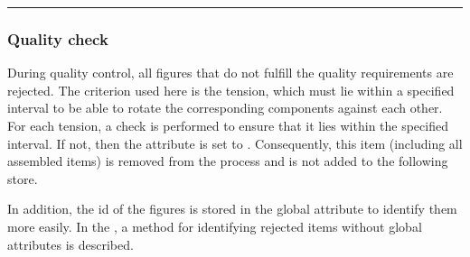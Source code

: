 \documentclass[letterpaper,10pt,english]{sphinxmanual}
\begin{document}
\bigskip\hrule\bigskip



\subsubsection{Quality check}
\label{\detokenize{source/Examples/example04:quality-check}}\label{\detokenize{source/Examples/example04:id2}}
\sphinxAtStartPar
During quality control, all figures that do not fulfill the quality requirements are rejected. The criterion used here
is the tension, which must lie within a specified interval to be able to rotate the corresponding components against
each other. For each tension, a check is performed to ensure that it lies within the specified interval. If not, then
the  attribute is set to . Consequently, this item (including all assembled items) is removed from the
process and is not added to the following store.

\sphinxAtStartPar
In addition, the id of the figures is stored in the global attribute  to identify them more easily. In the
{\hyperref[\detokenize{source/Examples/example04:identify-rejected}]{}}, a method for identifying rejected items without global attributes is described.
\end{document}
